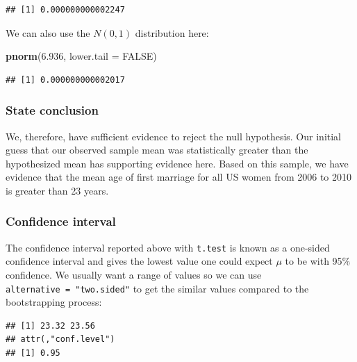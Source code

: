 \documentclass[]{tufte-book}
\newenvironment{Shaded}{\begin{snugshade}}{\end{snugshade}}
\newcommand{\KeywordTok}[1]{\textcolor[rgb]{0.13,0.29,0.53}{\textbf{{#1}}}}
\newcommand{\DataTypeTok}[1]{\textcolor[rgb]{0.13,0.29,0.53}{{#1}}}
\newcommand{\DecValTok}[1]{\textcolor[rgb]{0.00,0.00,0.81}{{#1}}}
\newcommand{\FloatTok}[1]{\textcolor[rgb]{0.00,0.00,0.81}{{#1}}}
\newcommand{\StringTok}[1]{\textcolor[rgb]{0.31,0.60,0.02}{{#1}}}
\newcommand{\OtherTok}[1]{\textcolor[rgb]{0.56,0.35,0.01}{{#1}}}
\newcommand{\NormalTok}[1]{{#1}}
\theoremstyle{definition}
\theoremstyle{definition}
\theoremstyle{remark}
\begin{document}
\begin{verbatim}
## [1] 0.000000000002247
\end{verbatim}

We can also use the \(N(0, 1)\) distribution here:

\begin{Shaded}
\begin{Highlighting}[]
\KeywordTok{pnorm}\NormalTok{(}\FloatTok{6.936}\NormalTok{, }\DataTypeTok{lower.tail =} \OtherTok{FALSE}\NormalTok{)}
\end{Highlighting}
\end{Shaded}

\begin{verbatim}
## [1] 0.000000000002017
\end{verbatim}

\subsubsection{State conclusion}\label{state-conclusion}

We, therefore, have sufficient evidence to reject the null hypothesis.
Our initial guess that our observed sample mean was statistically
greater than the hypothesized mean has supporting evidence here. Based
on this sample, we have evidence that the mean age of first marriage for
all US women from 2006 to 2010 is greater than 23 years.

\subsubsection{Confidence interval}\label{confidence-interval}

The confidence interval reported above with \texttt{t.test} is known as
a one-sided confidence interval and gives the lowest value one could
expect \(\mu\) to be with 95\% confidence. We usually want a range of
values so we can use \texttt{alternative\ =\ "two.sided"} to get the
similar values compared to the bootstrapping process:

\begin{Shaded}
\end{Shaded}

\begin{verbatim}
## [1] 23.32 23.56
## attr(,"conf.level")
## [1] 0.95
\end{verbatim}
\end{document}
